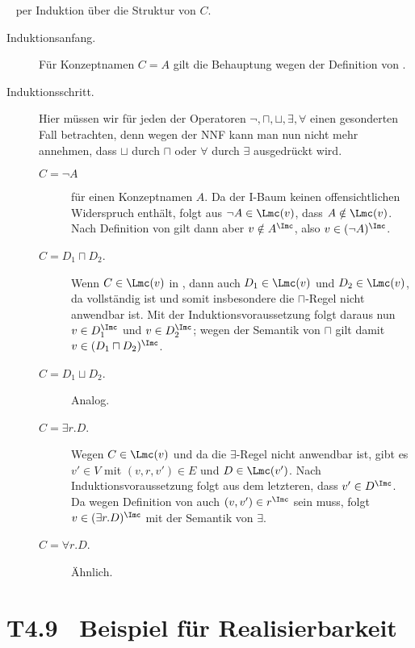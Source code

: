 \documentclass[fontsize=11pt, twoside=false, numbers=autoenddot]{scrbook}
\begin{document}
\par\medskip
{}~
per Induktion über die Struktur von $C$.
%
\begin{description}
  \item[Induktionsanfang.]
    Für Konzeptnamen $C=A$ gilt die Behauptung wegen der Definition von \Imc.
  \item[Induktionsschritt.]
    Hier müssen wir für jeden der Operatoren $\lnot,\sqcap,\sqcup,\exists,\forall$
    einen gesonderten Fall betrachten, denn wegen der NNF kann man nun
    nicht mehr annehmen, dass $\sqcup$ durch $\sqcap$ oder $\forall$ durch $\exists$
    ausgedrückt wird.
    \begin{description}
      \item[{\boldmath $C = \lnot A$}]
        für einen Konzeptnamen $A$.
        Da der I-Baum \Bmc keinen offensichtlichen Widerspruch enthält,
        folgt aus $\lnot A \in \Lmc(v)$,
        dass $A \notin \Lmc(v)$.
        Nach Definition von \Imc gilt dann aber $v \notin A^\Imc$,
        also $v \in (\lnot A)^\Imc$.
      \item[{\boldmath $C = D_1 \sqcap D_2$.}]
        Wenn $C \in \Lmc(v)$ in \Bmc,
        dann auch $D_1 \in \Lmc(v)$
        und $D_2 \in \Lmc(v)$,
        da \Bmc vollständig ist und somit insbesondere die
        $\sqcap$-Regel nicht anwendbar ist.
        Mit der Induktionsvoraussetzung folgt daraus nun $v \in D_1^\Imc$ und $v \in D_2^\Imc$;
        wegen der Semantik von $\sqcap$ gilt damit $v \in (D_1 \sqcap D_2)^\Imc$.
      \item[{\boldmath $C = D_1 \sqcup D_2$.}]
        Analog.
      \item[{\boldmath $C = \exists r.D$.}]
        Wegen $C \in \Lmc(v)$
        und da die $\exists$-Regel nicht anwendbar ist,
        gibt es $v' \in V$ mit $(v,r,v') \in E$ und $D \in \Lmc(v')$.
        Nach Induktionsvoraussetzung folgt aus dem letzteren,
        dass $v' \in D^\Imc$.
        Da wegen Definition von \Imc auch $(v,v') \in r^\Imc$ sein muss,
        folgt $v \in (\exists r.D)^\Imc$ mit der Semantik von $\exists$.
      \item[{\boldmath $C = \forall r.D$.}]
        Ähnlich.
        \qedhere
    \end{description}
\end{description}

\goodbreak

\section*{T4.9~ Beispiel für Realisierbarkeit}
\end{document}
